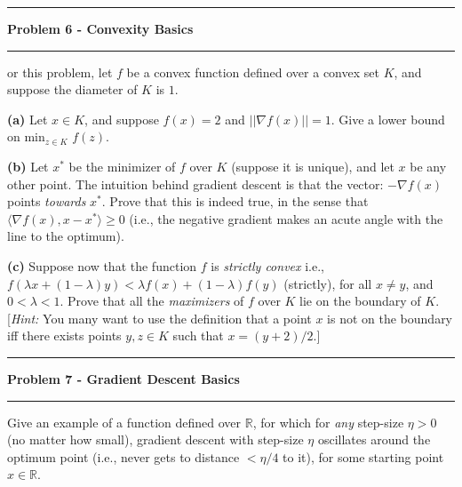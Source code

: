 \documentclass[11pt]{article}
\newcommand\question[2]{\vspace{.25in}\hrule\textbf{#1}\vspace{.5em}\hrule\vspace{.10in}}
\renewcommand\part[1]{\vspace{.10in}\textbf{(#1)}}
\begin{document}
\raggedright

\newcommand\NAME{Jake Pitkin}
\newcommand\UID{u0891770}
\newcommand\HWNUM{2}

\question{Problem 6 - Convexity Basics}

For this problem, let $f$ be a convex function defined over a convex set $K$, and suppose the diameter of $K$ is $1$.

\part{a} Let $x \in K$, and suppose $f(x) = 2$ and $\vert \vert \nabla f(x) \vert \vert = 1$. Give a lower bound on min$_{z \in K}$ $f(z)$.


\part{b} Let $x^*$ be the minimizer of $f$ over $K$ (suppose it is unique), and let $x$ be any other point. The intuition behind gradient descent is that the vector: $- \nabla f(x)$ points \textit{towards} $x^*$. Prove that this is indeed true, in the sense that $\langle \nabla f(x), x - x^* \rangle \geq 0$ (i.e., the negative gradient makes an acute angle with the line to the optimum).


\part{c} Suppose now that the function $f$ is \textit{strictly convex} i.e., $f(\lambda x + (1 - \lambda) y) < \lambda f(x) + (1 - \lambda) f(y)$ (strictly), for all $x \neq y$, and $0 < \lambda < 1$. Prove that all the \textit{maximizers} of $f$ over $K$ lie on the boundary of $K$. [\textit{Hint:} You many want to use the definition that a point $x$ is not on the boundary iff there exists points $y, z \in K$ such that $x = (y + 2)/2$.]


\question{Problem 7 - Gradient Descent Basics}

\part{a} Give an example of a function defined over $\mathbb{R}$, for which for \textit{any} step-size $\eta > 0$ (no matter how small), gradient descent with step-size $\eta$ oscillates around the optimum point (i.e., never gets to distance $< \eta/4$ to it), for some starting point $x \in \mathbb{R}$.
\end{document}
